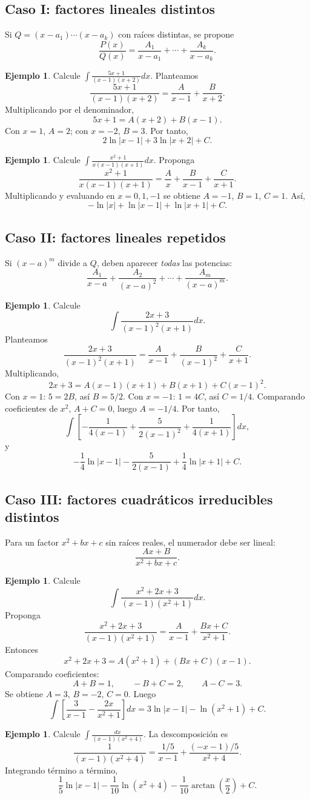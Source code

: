 \documentclass[12pt]{article}
\theoremstyle{definition}\newtheorem{definicion}[teorema]{Definición}\newtheorem{ejemplo}[teorema]{Ejemplo}\newtheorem{ejercicio}[teorema]{Ejercicio}
\theoremstyle{remark}\newtheorem*{observacion}{Observación}\newtheorem*{advertencia}{Advertencia}\newtheorem*{estrategia}{Estrategia}
\begin{document}
\subsection{Caso I: factores lineales distintos}
Si $Q=(x-a_1)\cdots(x-a_k)$ con raíces distintas, se propone
\[\frac{P(x)}{Q(x)}=\frac{A_1}{x-a_1}+\cdots+\frac{A_k}{x-a_k}.\]
\begin{ejemplo}Calcule $\int\frac{5x+1}{(x-1)(x+2)}dx$. Planteamos
\[\frac{5x+1}{(x-1)(x+2)}=\frac{A}{x-1}+\frac{B}{x+2}.\]
Multiplicando por el denominador,
\[5x+1=A(x+2)+B(x-1).\]
Con $x=1$, $A=2$; con $x=-2$, $B=3$. Por tanto,
\[\boxed{2\ln|x-1|+3\ln|x+2|+C}.\]\end{ejemplo}
\begin{ejemplo}Calcule $\int\frac{x^2+1}{x(x-1)(x+1)}dx$. Proponga
\[\frac{x^2+1}{x(x-1)(x+1)}=\frac{A}{x}+\frac{B}{x-1}+\frac{C}{x+1}.\]
Multiplicando y evaluando en $x=0,1,-1$ se obtiene $A=-1$, $B=1$, $C=1$. Así,
\[\boxed{-\ln|x|+\ln|x-1|+\ln|x+1|+C}.\]\end{ejemplo}

\subsection{Caso II: factores lineales repetidos}
Si $(x-a)^m$ divide a $Q$, deben aparecer \emph{todas} las potencias:
\[\frac{A_1}{x-a}+\frac{A_2}{(x-a)^2}+\cdots+\frac{A_m}{(x-a)^m}.\]
\begin{ejemplo}Calcule
\[\int\frac{2x+3}{(x-1)^2(x+1)}dx.\]
Planteamos
\[\frac{2x+3}{(x-1)^2(x+1)}=\frac{A}{x-1}+\frac{B}{(x-1)^2}+\frac{C}{x+1}.\]
Multiplicando,
\[2x+3=A(x-1)(x+1)+B(x+1)+C(x-1)^2.\]
Con $x=1$: $5=2B$, así $B=5/2$. Con $x=-1$: $1=4C$, así $C=1/4$. Comparando coeficientes de $x^2$, $A+C=0$, luego $A=-1/4$. Por tanto,
\[\int\left[-\frac1{4(x-1)}+\frac{5}{2(x-1)^2}+\frac1{4(x+1)}\right]dx,\]
y
\[\boxed{-\frac14\ln|x-1|-\frac{5}{2(x-1)}+\frac14\ln|x+1|+C}.\]\end{ejemplo}

\subsection{Caso III: factores cuadráticos irreducibles distintos}
Para un factor $x^2+bx+c$ sin raíces reales, el numerador debe ser lineal:
\[\frac{Ax+B}{x^2+bx+c}.\]
\begin{ejemplo}Calcule
\[\int\frac{x^2+2x+3}{(x-1)(x^2+1)}dx.\]
Proponga
\[\frac{x^2+2x+3}{(x-1)(x^2+1)}=\frac{A}{x-1}+\frac{Bx+C}{x^2+1}.\]
Entonces
\[x^2+2x+3=A(x^2+1)+(Bx+C)(x-1).\]
Comparando coeficientes:
\[A+B=1,\qquad -B+C=2,\qquad A-C=3.\]
Se obtiene $A=3$, $B=-2$, $C=0$. Luego
\[\int\left[\frac3{x-1}-\frac{2x}{x^2+1}\right]dx
=\boxed{3\ln|x-1|-\ln(x^2+1)+C}.\]\end{ejemplo}
\begin{ejemplo}Calcule $\int\frac{dx}{(x-1)(x^2+4)}$. La descomposición es
\[\frac1{(x-1)(x^2+4)}=\frac{1/5}{x-1}+\frac{(-x-1)/5}{x^2+4}.\]
Integrando término a término,
\[\boxed{\frac15\ln|x-1|-\frac1{10}\ln(x^2+4)-\frac1{10}\arctan\left(\frac{x}{2}\right)+C}.\]\end{ejemplo}
\end{document}
